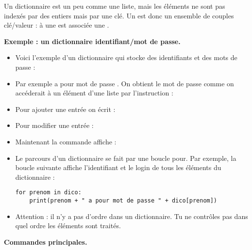 \documentclass[11pt,class=report,crop=false]{standalone}
\begin{document}
\begin{cours}[Dictionnaire]


Un dictionnaire est un peu comme une liste, mais les éléments ne sont pas indexés par des entiers mais par une \og{}clé\fg{}. 
Un  est donc un ensemble de couples clé/valeur : à une  est associée une .

\medskip

\textbf{Exemple : un dictionnaire identifiant/mot de passe.}

\begin{itemize}
  \item Voici l'exemple d'un dictionnaire  qui stocke des identifiants et des mots de passe : 

  \item Par exemple  a pour mot de passe . On obtient le mot de passe
comme on accéderait à un élément d'une liste par l'instruction :

  \item Pour ajouter une entrée on écrit : 

  \item Pour modifier une entrée : 
 
  \item Maintenant la commande  affiche :

  \item Le parcours d'un dictionnaire se fait par une boucle \og{}pour\fg{}. Par exemple, la boucle suivante affiche l'identifiant et le login de tous les éléments du dictionnaire :
\begin{lstlisting}
for prenom in dico:
    print(prenom + " a pour mot de passe " + dico[prenom])
\end{lstlisting}

  \item Attention : il n'y a pas d'ordre dans un dictionnaire. Tu ne contrôles pas dans quel ordre les éléments sont traités.
\end{itemize}
\bigskip

\textbf{Commandes principales.}


\end{cours}
\end{document}
